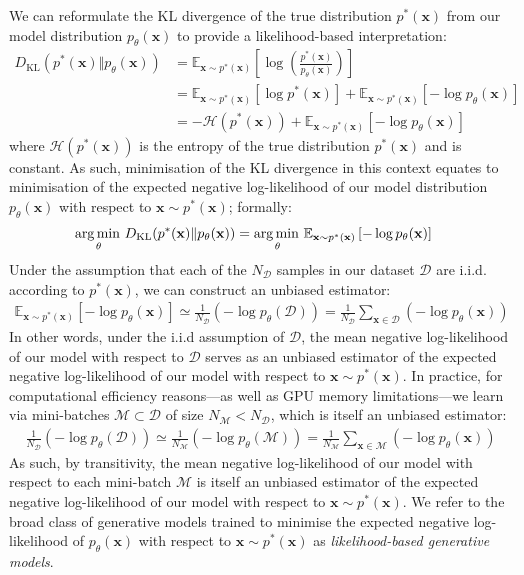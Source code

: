 \documentclass[ oneside,%
                    author={George Herbert},
                    degree={MSci},
                     title={Diffusion Models for Time-Evolving Precipitation Fields},
                  subtitle={}]{dissertation}
\begin{document}
We can reformulate the KL divergence of the true distribution $p^*(\mathbf{x})$ from our model distribution $p_\theta(\mathbf{x})$ to provide a likelihood-based interpretation:
\begin{align}
      D_{\mathrm{KL}}(p^*(\mathbf{x})\Vert p_\theta(\mathbf{x}))&=\mathbb{E}_{\mathbf{x}\sim p^*(\mathbf{x})}\left[\log\left(\frac{p^*(\mathbf{x})}{p_\theta(\mathbf{x})}\right)\right]\\
      &=\mathbb{E}_{\mathbf{x}\sim p^*(\mathbf{x})}\left[\log p^*(\mathbf{x})\right]+\mathbb{E}_{\mathbf{x}\sim p^*(\mathbf{x})}\left[-\log p_\theta(\mathbf{x})\right]\\
      &=-\mathcal{H}(p^*(\mathbf{x}))+\mathbb{E}_{\mathbf{x}\sim p^*(\mathbf{x})}\left[-\log p_\theta(\mathbf{x})\right]
\end{align}
where $\mathcal{H}{(p^*(\mathbf{x}))}$ is the entropy of the true distribution $p^*(\mathbf{x})$ and is constant. As such, minimisation of the KL divergence in this context equates to minimisation of the expected negative log-likelihood of our model distribution $p_\theta(\mathbf{x})$ with respect to $\mathbf{x}\sim p^*(\mathbf{x})$; formally:
\begin{align}
      \operatorname*{arg\,min\,}_\theta D_{\mathrm{KL}}(p^*(\mathbf{x})\Vert p_\theta(\mathbf{x}))&=\operatorname*{arg\,min\,}_\theta \mathbb{E}_{\mathbf{x}\sim p^*(\mathbf{x})}\left[-\log p_\theta(\mathbf{x})\right]
\end{align}
Under the assumption that each of the $N_\mathcal{D}$ samples in our dataset $\mathcal{D}$ are i.i.d. according to $p^*(\mathbf{x})$, we can construct an unbiased estimator:
\begin{align}
      \mathbb{E}_{\mathbf{x}\sim p^*(\mathbf{x})}\left[-\log p_\theta(\mathbf{x})\right]\simeq \frac{1}{N_{\mathcal{D}}}\left(-\log p_\theta(\mathcal{D})\right) = \frac{1}{N_{\mathcal{D}}} \sum_{\mathbf{x}\in\mathcal{D}} \left(-\log p_\theta(\mathbf{x})\right)
\end{align}
In other words, under the i.i.d assumption of $\mathcal{D}$, the mean negative log-likelihood of our model with respect to $\mathcal{D}$ serves as an unbiased estimator of the expected negative log-likelihood of our model with respect to $\mathbf{x}\sim p^*(\mathbf{x})$. In practice, for computational efficiency reasons---as well as GPU memory limitations---we learn via mini-batches $\mathcal{M}\subset \mathcal{D}$ of size $N_\mathcal{M} < N_\mathcal{D}$, which is itself an unbiased estimator:
\begin{align}
      \frac{1}{N_\mathcal{D}}\left(-\log p_\theta(\mathcal{D})\right)\simeq \frac{1}{N_\mathcal{M}}\left(-\log p_\theta(\mathcal{M})\right)=\frac{1}{N_\mathcal{M}}\sum_{\mathbf{x}\in\mathcal{M}}\left(-\log p_\theta(\mathbf{x})\right)
\end{align}
As such, by transitivity, the mean negative log-likelihood of our model with respect to each mini-batch $\mathcal{M}$ is itself an unbiased estimator of the expected negative log-likelihood of our model with respect to $\mathbf{x}\sim p^*(\mathbf{x})$. We refer to the broad class of generative models trained to minimise the expected negative log-likelihood of $p_\theta(\mathbf{x})$ with respect to $\mathbf{x}\sim p^*(\mathbf{x})$ as \textit{likelihood-based generative models}.
\end{document}
